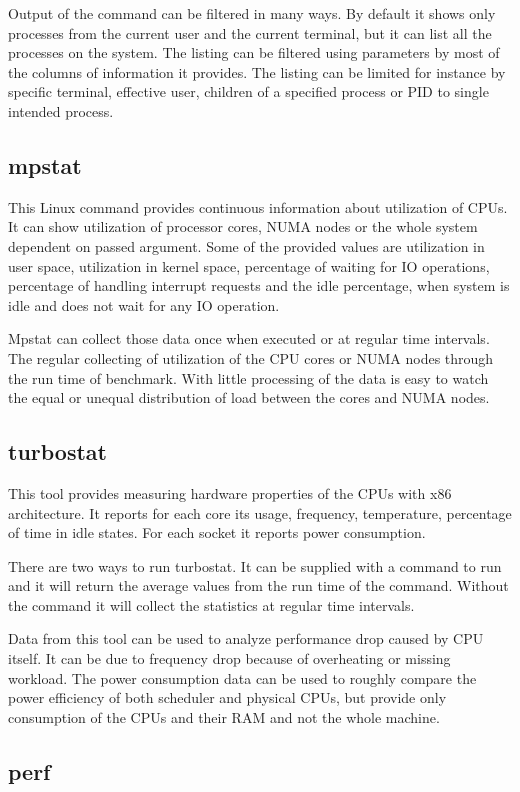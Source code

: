 Output of the command can be filtered in many ways. By default it shows only
processes from the current user and the current terminal, but it can list all
the processes on the system. The listing can be filtered using parameters by
most of the columns of information it provides. The listing can be limited for
instance by specific terminal, effective user, children of a specified process
or PID to single intended process.

\subsection{mpstat}
This Linux command provides continuous information about utilization of CPUs. It
can show utilization of processor cores, NUMA nodes or the whole system
dependent on passed argument. Some of the provided values are utilization in
user space, utilization in kernel space, percentage of waiting for IO
operations, percentage of handling interrupt requests and the idle percentage,
when system is idle and does not wait for any IO operation.

Mpstat can collect those data once when executed or at regular time intervals.
The regular collecting of utilization of the CPU cores or NUMA nodes through the
run time of benchmark. With little processing of the data is easy to watch the
equal or unequal distribution of load between the cores and NUMA nodes.

\subsection{turbostat}
This tool provides measuring hardware properties of the CPUs with x86
architecture. It reports for each core its usage, frequency, temperature,
percentage of time in idle states. For each socket it reports power consumption.

There are two ways to run turbostat. It can be supplied with a command to run
and it will return the average values from the run time of the command. Without
the command it will collect the statistics at regular time intervals.

Data from this tool can be used to analyze performance drop caused by CPU
itself. It can be due to frequency drop because of overheating or missing
workload. The power consumption data can be used to roughly compare the power
efficiency of both scheduler and physical CPUs, but provide only consumption of
the CPUs and their RAM and not the whole machine.

\subsection{perf}


